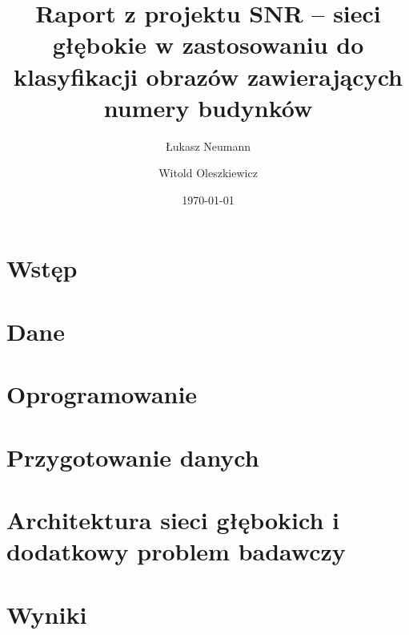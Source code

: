 \documentclass[12pt]{article}
\title{Raport z projektu SNR -- sieci głębokie w zastosowaniu do klasyfikacji obrazów zawierających numery budynków}
\author{
        Łukasz Neumann \\
            \and
        Witold Oleszkiewicz \\
}
\date{\today}
\begin{document}
\maketitle


\section{Wstęp}

\section{Dane}

\section{Oprogramowanie}

\section{Przygotowanie danych}

\section{Architektura sieci głębokich i dodatkowy problem badawczy}

\section{Wyniki}



\end{document}
